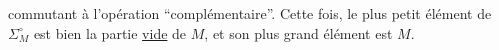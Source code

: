 
commutant à l'opération ``complémentaire''.
Cette fois, le plus petit élément de $\Sigma_M^\circ$ est bien la partie \uline{vide} de $M$, et son plus grand élément est $M$.

